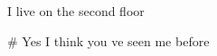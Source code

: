 \documentclass[a4paper,12pt]{article}
\begin{document}
    I live on the second floor


  # Yes I think you ve seen me before
\end{document}
